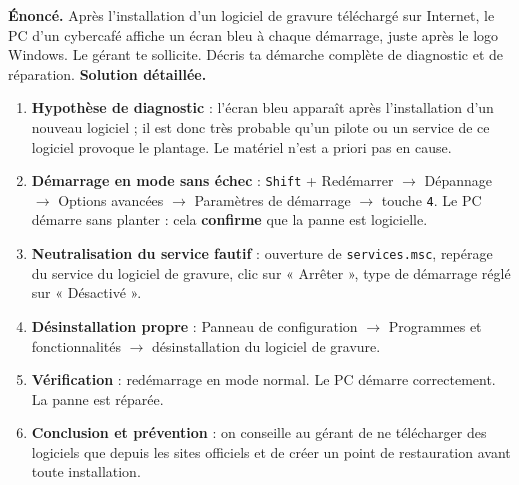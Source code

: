 \documentclass[11pt]{article}
\begin{document}
\begin{exoresolu}
\textbf{Énoncé.} Après l'installation d'un logiciel de gravure téléchargé sur Internet, le PC d'un cybercafé affiche un écran bleu à chaque démarrage, juste après le logo Windows. Le gérant te sollicite. Décris ta démarche complète de diagnostic et de réparation.
\tcblower
\textbf{Solution détaillée.}
\begin{enumerate}
\item \textbf{Hypothèse de diagnostic} : l'écran bleu apparaît après l'installation d'un nouveau logiciel ; il est donc très probable qu'un pilote ou un service de ce logiciel provoque le plantage. Le matériel n'est a priori pas en cause.
\item \textbf{Démarrage en mode sans échec} : \texttt{Shift} + Redémarrer $\rightarrow$ Dépannage $\rightarrow$ Options avancées $\rightarrow$ Paramètres de démarrage $\rightarrow$ touche \texttt{4}. Le PC démarre sans planter : cela \textbf{confirme} que la panne est logicielle.
\item \textbf{Neutralisation du service fautif} : ouverture de \texttt{services.msc}, repérage du service du logiciel de gravure, clic sur « Arrêter », type de démarrage réglé sur « Désactivé ».
\item \textbf{Désinstallation propre} : Panneau de configuration $\rightarrow$ Programmes et fonctionnalités $\rightarrow$ désinstallation du logiciel de gravure.
\item \textbf{Vérification} : redémarrage en mode normal. Le PC démarre correctement. La panne est réparée.
\item \textbf{Conclusion et prévention} : on conseille au gérant de ne télécharger des logiciels que depuis les sites officiels et de créer un point de restauration avant toute installation.
\end{enumerate}
\end{exoresolu}
\end{document}
